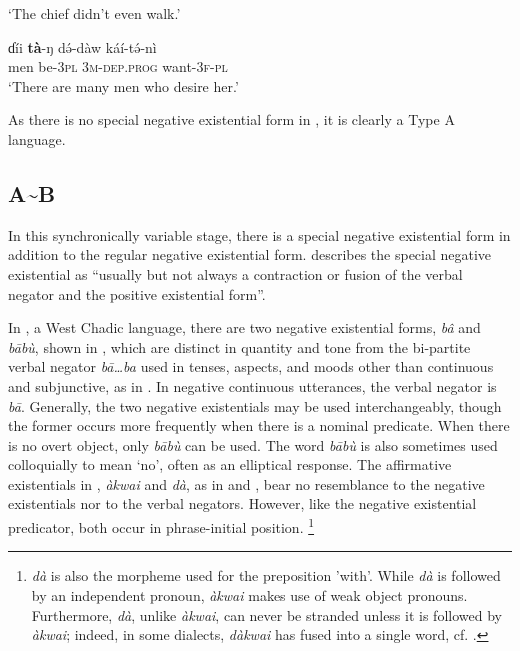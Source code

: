 \documentclass[output=paper,draft,draftmode,colorlinks,citecolor=brown]{langscibook}
\begin{document}
\glt `The chief didn't even walk.'
\ex\label{ex:gidar-desire}

\gll ɗíi \textbf{tà}-ŋ d\'ə-dà{\op}w{\cp} káí-t\'ə-nì\\
men be-3\textsc{pl} 3\textsc{m}-\textsc{dep.prog} want-3\textsc{f}-\textsc{pl}\\

\glt `There are many men who desire her.'

\z
\z

As there is no special negative existential form in , it is clearly a Type A language. 

\subsection{A{\textasciitilde}B}\label{sec:3:3.2}

In this synchronically variable stage, there is a special negative existential form in addition to the regular negative existential form. \citet[7]{Croft1991} describes the special negative existential as ``usually but not always a contraction or fusion of the verbal negator and the positive existential form''.

In , a West Chadic language, there are two negative existential
forms, \textit{bâ} and \textit{b\=abù}, shown in ,
which are distinct in quantity and tone from the bi-partite verbal negator
\textit{b\=a\ldots{}ba} used in tenses, aspects, and moods other than continuous
and subjunctive, as in .  In negative continuous
utterances, the verbal negator is \textit{b\=a}. Generally, the two
negative existentials may be used interchangeably, though the former occurs
more frequently when there is a nominal predicate. When there is no overt
object, only \textit{b\=abù} can be used. The word \textit{b\=abù} is
also sometimes used colloquially to mean `no', often as an elliptical
response.  The affirmative existentials in
, \textit{à{}kwai} and \textit{dà}, as in 
and , bear no resemblance to the
negative existentials nor to the verbal negators. However, like the
negative existential predicator, both occur in phrase-initial position.%
%
\footnote{\textit{dà} is also the morpheme used for the preposition 'with'.
While \textit{dà} is followed by an independent pronoun, \textit{àkwai} makes use of weak object pronouns. Furthermore, \textit{dà}, unlike \textit{àkwai}, can never be stranded unless it is followed by \textit{àkwai}; indeed, in some dialects, \textit{dàkwai} has fused into a single word, cf. \citet{Newman1971}.}
\end{document}
